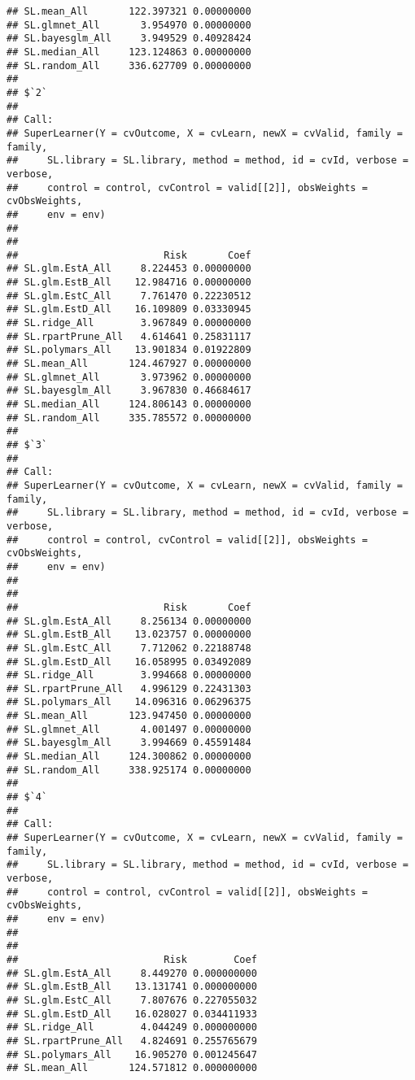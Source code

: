 \documentclass{article}\usepackage[]{graphicx}\usepackage[]{xcolor}
\makeatletter
\newenvironment{kframe}{%
 \def\at@end@of@kframe{}%
 \ifinner\ifhmode%
  \def\at@end@of@kframe{\end{minipage}}%
  \begin{minipage}{\columnwidth}%
 \fi\fi%
 \def\FrameCommand##1{\hskip\@totalleftmargin \hskip-\fboxsep
 \colorbox{shadecolor}{##1}\hskip-\fboxsep
     \hskip-\linewidth \hskip-\@totalleftmargin \hskip\columnwidth}%
 \MakeFramed {\advance\hsize-\width
   \@totalleftmargin\z@ \linewidth\hsize
   \@setminipage}}%
 {\par\unskip\endMakeFramed%
 \at@end@of@kframe}
\newenvironment{knitrout}{}{} %
\makeatother
\begin{document}
\begin{knitrout}
\begin{kframe}
\begin{verbatim}
## SL.mean_All       122.397321 0.00000000
## SL.glmnet_All       3.954970 0.00000000
## SL.bayesglm_All     3.949529 0.40928424
## SL.median_All     123.124863 0.00000000
## SL.random_All     336.627709 0.00000000
## 
## $`2`
## 
## Call:  
## SuperLearner(Y = cvOutcome, X = cvLearn, newX = cvValid, family = family,  
##     SL.library = SL.library, method = method, id = cvId, verbose = verbose,  
##     control = control, cvControl = valid[[2]], obsWeights = cvObsWeights,  
##     env = env) 
## 
## 
##                         Risk       Coef
## SL.glm.EstA_All     8.224453 0.00000000
## SL.glm.EstB_All    12.984716 0.00000000
## SL.glm.EstC_All     7.761470 0.22230512
## SL.glm.EstD_All    16.109809 0.03330945
## SL.ridge_All        3.967849 0.00000000
## SL.rpartPrune_All   4.614641 0.25831117
## SL.polymars_All    13.901834 0.01922809
## SL.mean_All       124.467927 0.00000000
## SL.glmnet_All       3.973962 0.00000000
## SL.bayesglm_All     3.967830 0.46684617
## SL.median_All     124.806143 0.00000000
## SL.random_All     335.785572 0.00000000
## 
## $`3`
## 
## Call:  
## SuperLearner(Y = cvOutcome, X = cvLearn, newX = cvValid, family = family,  
##     SL.library = SL.library, method = method, id = cvId, verbose = verbose,  
##     control = control, cvControl = valid[[2]], obsWeights = cvObsWeights,  
##     env = env) 
## 
## 
##                         Risk       Coef
## SL.glm.EstA_All     8.256134 0.00000000
## SL.glm.EstB_All    13.023757 0.00000000
## SL.glm.EstC_All     7.712062 0.22188748
## SL.glm.EstD_All    16.058995 0.03492089
## SL.ridge_All        3.994668 0.00000000
## SL.rpartPrune_All   4.996129 0.22431303
## SL.polymars_All    14.096316 0.06296375
## SL.mean_All       123.947450 0.00000000
## SL.glmnet_All       4.001497 0.00000000
## SL.bayesglm_All     3.994669 0.45591484
## SL.median_All     124.300862 0.00000000
## SL.random_All     338.925174 0.00000000
## 
## $`4`
## 
## Call:  
## SuperLearner(Y = cvOutcome, X = cvLearn, newX = cvValid, family = family,  
##     SL.library = SL.library, method = method, id = cvId, verbose = verbose,  
##     control = control, cvControl = valid[[2]], obsWeights = cvObsWeights,  
##     env = env) 
## 
## 
##                         Risk        Coef
## SL.glm.EstA_All     8.449270 0.000000000
## SL.glm.EstB_All    13.131741 0.000000000
## SL.glm.EstC_All     7.807676 0.227055032
## SL.glm.EstD_All    16.028027 0.034411933
## SL.ridge_All        4.044249 0.000000000
## SL.rpartPrune_All   4.824691 0.255765679
## SL.polymars_All    16.905270 0.001245647
## SL.mean_All       124.571812 0.000000000

\end{verbatim}
\end{kframe}
\end{knitrout}
\end{document}
